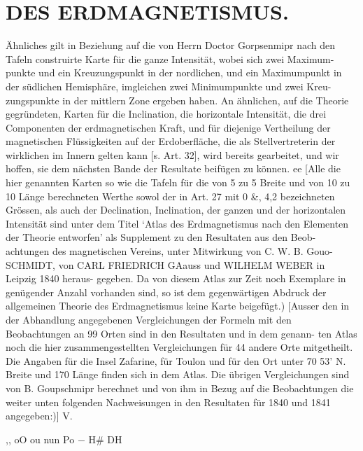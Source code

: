 \documentclass[12pt,a4paper]{article}
\begin{document}
\newpage


\newpage


\newpage


\section*{DES ERDMAGNETISMUS.}
Ähnliches gilt in Beziehung auf die von Herrn Doctor Gorpsenmipr nach den Tafeln construirte Karte für die ganze Intensität, wobei sich zwei Maximum- punkte und ein Kreuzungspunkt in der nordlichen, und ein Maximumpunkt in der südlichen Hemisphäre, imgleichen zwei Minimumpunkte und zwei Kreu- zungspunkte in der mittlern Zone ergeben haben. An ähnlichen, auf die Theorie gegründeten, Karten für die Inclination, die horizontale Intensität, die drei Componenten der erdmagnetischen Kraft, und für diejenige Vertheilung der magnetischen Flüssigkeiten auf der Erdoberfläche, die als Stellvertreterin der wirklichen im Innern gelten kann [s. Art. 32], wird bereits gearbeitet, und wir hoffen, sie dem nächsten Bande der Resultate beifügen zu können. ee [Alle die hier genannten Karten so wie die Tafeln für die von 5 zu 5\textdegree{} Breite und von 10 zu 10\textdegree{} Länge berechneten Werthe sowol der in Art. 27 mit 0 \&, 4,2 bezeichneten Grössen, als auch der Declination, Inclination, der ganzen und der horizontalen Intensität sind unter dem Titel `Atlas des Erdmagnetismus nach den Elementen der Theorie entworfen' als Supplement zu den Resultaten aus den Beob- achtungen des magnetischen Vereins, unter Mitwirkung von C. W. B. Gouo- SCHMIDT, von CARL FRIEDRICH GAauss und WILHELM WEBER in Leipzig 1840 heraus- gegeben. Da von diesem Atlas zur Zeit noch Exemplare in genügender Anzahl vorhanden sind, so ist dem gegenwärtigen Abdruck der allgemeinen Theorie des Erdmagnetismus keine Karte beigefügt.) [Ausser den in der Abhandlung angegebenen Vergleichungen der Formeln mit den Beobachtungen an 99 Orten sind in den Resultaten und in dem genann- ten Atlas noch die hier zusammengestellten Vergleichungen für 44 andere Orte mitgetheilt. Die Angaben für die Insel Zafarine, für Toulon und für den Ort unter 70\textdegree{} 53' N. Breite und 170\textdegree{} Länge finden sich in dem Atlas. Die übrigen Vergleichungen sind von B. Goupschmipr berechnet und von ihm in Bezug auf die Beobachtungen die weiter unten folgenden Nachweisungen in den Resultaten für 1840 und 1841 angegeben:)] V.


\newpage


,, oO ou nun Po
$-$
H\# DH
\end{document}
